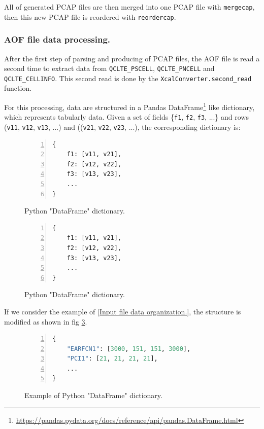\documentclass[a4paper, 11pt]{report}
\begin{document}
    All of generated PCAP files are then merged into one PCAP file with \texttt{mergecap}, then this new PCAP file is reordered with \texttt{reordercap}.
    
    \subsubsection{AOF file data processing.}
    After the first step of parsing and producing of PCAP files, the AOF file is read a second time to extract data from \texttt{QCLTE\_PSCELL}, \texttt{QCLTE\_PNCELL} and \texttt{QCLTE\_CELLINFO}. This second read is done by the \texttt{XcalConverter.second\_read} function. \newline
    
    For this processing, data are structured in a Pandas DataFrame\footnote{\url{https://pandas.pydata.org/docs/reference/api/pandas.DataFrame.html}} like dictionary, which represents tabularly data. Given a set of fields \{\texttt{f1}, \texttt{f2}, \texttt{f3}, ...\} and rows (\texttt{v11}, \texttt{v12}, \texttt{v13}, ...) and ((\texttt{v21}, \texttt{v22}, \texttt{v23}, ...), the corresponding dictionary is:
    
    \begin{figure}[H]
        \centering
        \begin{lstlisting}[numbers=left, numberstyle=\ttfamily, breaklines=true, language=Python]
{
    f1: [v11, v21],
    f2: [v12, v22],
    f3: [v13, v23],
    ...
}\end{lstlisting}
        \caption{Python "DataFrame" dictionary.}
        \label{Python "DataFrame" dictionary}
    \end{figure}
    
        \begin{figure}[H]
        \centering
        \begin{lstlisting}[numbers=left, numberstyle=\ttfamily, breaklines=true, language=Python]
{
    f1: [v11, v21],
    f2: [v12, v22],
    f3: [v13, v23],
    ...
}\end{lstlisting}
        \caption{Python "DataFrame" dictionary.}
        \label{Python "DataFrame" dictionary}
    \end{figure}
    
    If we consider the example of \ref{Input file data organization.}, the structure is modified as shown in fig \ref{fig:PythonDataFramexAmple}.

    \begin{figure}[H]
        \centering
        \begin{lstlisting}[numbers=left, numberstyle=\ttfamily, breaklines=true, language=Python]
{
    "EARFCN1": [3000, 151, 151, 3000],
    "PCI1": [21, 21, 21, 21],
    ...
}\end{lstlisting}
        \caption{Example of Python "DataFrame" dictionary.}
        \label{fig:PythonDataFramexAmple}
    \end{figure}
    
\end{document}
